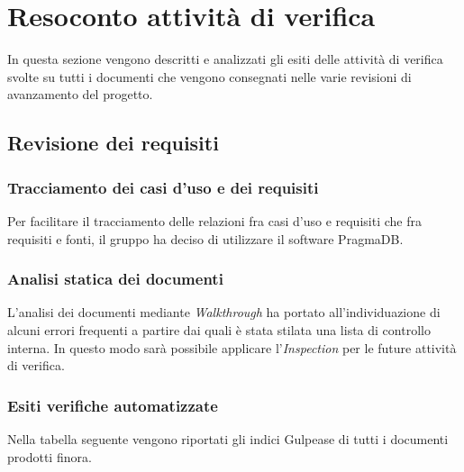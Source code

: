 \section{Resoconto attività di verifica}
In questa sezione vengono descritti e analizzati gli esiti delle attività
di verifica svolte su tutti i documenti che vengono consegnati nelle varie 
revisioni di avanzamento del progetto.

\subsection{Revisione dei requisiti}
\subsubsection{Tracciamento dei casi d'uso e dei requisiti}
Per facilitare il tracciamento delle relazioni fra casi d'uso e requisiti che
fra requisiti e fonti, il gruppo ha deciso di utilizzare il software PragmaDB.

\subsubsection{Analisi statica dei documenti}
L'analisi dei documenti mediante \textit{Walkthrough}\glo{} ha portato 
all'individuazione di alcuni errori frequenti a partire dai quali è stata 
stilata una lista di controllo interna. In questo modo sarà possibile applicare
l'\textit{Inspection}\glo{} per le future attività di verifica.

\subsubsection{Esiti verifiche automatizzate}
Nella tabella seguente vengono riportati gli indici Gulpease\glo{} di tutti
i documenti prodotti finora.

	
